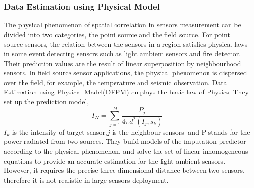 \subsubsection{Data Estimation using Physical Model}
The physical phenomenon of spatial correlation in sensors measurement can be divided into two categories, the point source and the field source\cite{viran:spatialtemporal}. For point source sensors, the relation between the sensors in a region satisfies physical laws in some event detecting sensors such as light ambient sensors and fire detector. 
Their prediction values are the result of linear superposition by neighbourhood sensors. 
In field source sensor applications, the physical phenomenon is dispersed over the field, for example, the temperature and seismic observation. 
Data Estimation using Physical Model(DEPM)\cite{LI:DESM} employs the basic law of Physics.
They set up the prediction model,  
\begin{equation}
I_K =\sum_{j=1}^M\frac{P_j}{4\pi d^2(I_j,s_k)}
\label{DEPM}
\end{equation} 
$I_k$ is the intensity of target sensor,$j$ is the neighbour sensors, and P stands for the power radiated from two sources. 
They build models of the imputation predictor according to the physical phenomenon, and solve the set of linear inhomogeneous equations to provide an accurate estimation for the light ambient sensors. However, it requires the precise  three-dimensional distance between two sensors, therefore it is not realistic in large sensors deployment.
